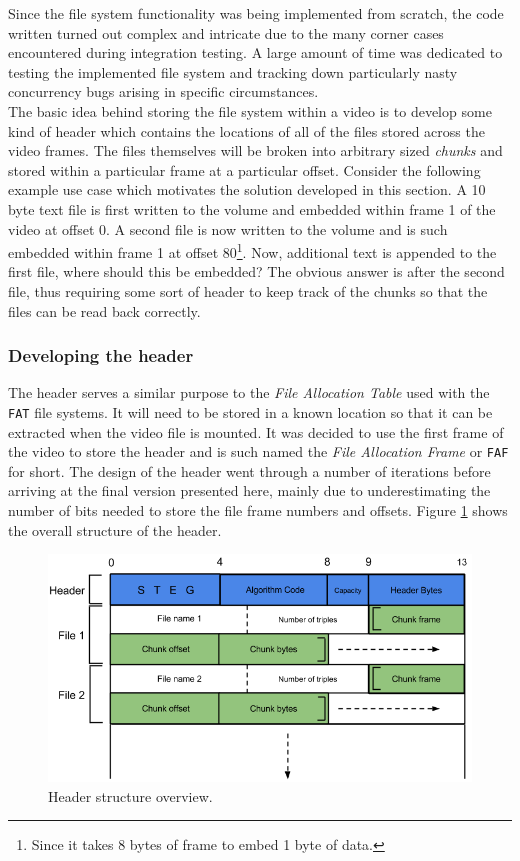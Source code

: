 \documentclass[paper=a4, fontsize=11pt,twoside]{scrartcl}
\numberwithin{table}{section}
\numberwithin{figure}{section}
\numberwithin{algorithm}{section}
\begin{document}
Since the file system functionality was being implemented from scratch, the code written turned out complex and intricate due to the many corner cases encountered during integration testing. A large amount of time was dedicated to testing the implemented file system and tracking down particularly nasty concurrency bugs arising in specific circumstances.\\

The basic idea behind storing the file system within a video is to develop some kind of header which contains the locations of all of the files stored across the video frames. The files themselves will be broken into arbitrary sized \textit{chunks} and stored within a particular frame at a particular offset. Consider the following example use case which motivates the solution developed in this section. A 10 byte text file is first written to the volume and embedded within frame 1 of the video at offset 0. A second file is now written to the volume and is such embedded within frame 1 at offset 80\footnote{Since it takes 8 bytes of frame to embed 1 byte of data.}. Now, additional text is appended to the first file, where should this be embedded? The obvious answer is after the second file, thus requiring some sort of header to keep track of the chunks so that the files can be read back correctly.

\subsubsection{Developing the header}

The header serves a similar purpose to the \textit{File Allocation Table} used with the \texttt{FAT} file systems. It will need to be stored in a known location so that it can be extracted when the video file is mounted. It was decided to use the first frame of the video to store the header and is such named the \textit{File Allocation Frame} or \texttt{FAF} for short. The design of the header went through a number of iterations before arriving at the final version presented here, mainly due to underestimating the number of bits needed to store the file frame numbers and offsets. Figure \ref{header} shows the overall structure of the header.

\begin{figure}[!h]
\centerline{\includegraphics[width=\textwidth]{images/header.png}}
\caption{Header structure overview.}
\label{header}
\end{figure}
\end{document}
